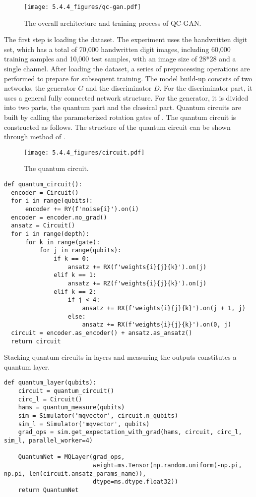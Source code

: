\begin{figure}[ht]
  \centering
  \texttt{[image: 5.4.4\_figures/qc-gan.pdf]}
  \caption{\label{qc-gan} The overall architecture and training process of QC-GAN.}
\end{figure}

The first step is loading the dataset. The experiment uses the handwritten digit set, which has a total of 70,000 handwritten digit images, including 60,000 training samples and 10,000 test samples, with an image size of 28*28 and a single channel. After loading the dataset, a series of preprocessing operations are performed to prepare for subsequent training. The model build-up consists of two networks, the generator ${G}$ and the discriminator ${D}$. For the discriminator part, it uses a general fully connected network structure. For the generator, it is divided into two parts, the quantum part and the classical part. Quantum circuits are built by calling the parameterized rotation gates of \MindQuantum. The quantum circuit is constructed as follows. The structure of the quantum circuit can be shown through \methodsummary method of \Circuit.
\begin{figure*}[htbp]
  \centering
  \texttt{[image: 5.4.4\_figures/circuit.pdf]}
  \caption{\label{quantum-circuit} The quantum circuit.}
\end{figure*}

\begin{lstlisting}
def quantum_circuit():
  encoder = Circuit()
  for i in range(qubits):
      encoder += RY(f'noise{i}').on(i)
  encoder = encoder.no_grad()
  ansatz = Circuit()
  for i in range(depth):
      for k in range(gate):
          for j in range(qubits):
              if k == 0:
                  ansatz += RX(f'weights{i}{j}{k}').on(j)
              elif k == 1:
                  ansatz += RZ(f'weights{i}{j}{k}').on(j)
              elif k == 2:
                  if j < 4:
                      ansatz += RX(f'weights{i}{j}{k}').on(j + 1, j)
                  else:
                      ansatz += RX(f'weights{i}{j}{k}').on(0, j)
  circuit = encoder.as_encoder() + ansatz.as_ansatz()
  return circuit
\end{lstlisting}
Stacking quantum circuits in layers and measuring the outputs constitutes a quantum layer.
\begin{lstlisting}
def quantum_layer(qubits):
    circuit = quantum_circuit()
    circ_l = Circuit()
    hams = quantum_measure(qubits)
    sim = Simulator('mqvector', circuit.n_qubits)
    sim_l = Simulator('mqvector', qubits)
    grad_ops = sim.get_expectation_with_grad(hams, circuit, circ_l, sim_l, parallel_worker=4)

    QuantumNet = MQLayer(grad_ops,
                         weight=ms.Tensor(np.random.uniform(-np.pi, np.pi, len(circuit.ansatz_params_name)),
                         dtype=ms.dtype.float32))
    return QuantumNet
\end{lstlisting}

